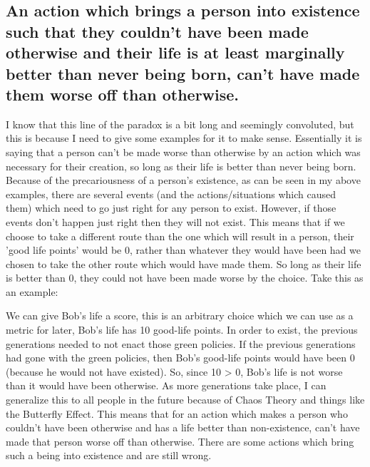\subsection{An action which brings a person into existence such that they couldn’t have been made otherwise and their life is at least marginally better than never being born, can’t have made them worse off than otherwise.}

I know that this line of the paradox is a bit long and seemingly convoluted, but this is because I need to give some examples for it to make sense. Essentially it is saying that a person can't be made worse than otherwise by an action which was necessary for their creation, so long as their life is better than never being born. Because of the precariousness of a person's existence, as can be seen in my above examples, there are several events (and the actions/situations which caused them) which need to go just right for any person to exist. However, if those events don't happen just right then they will not exist. This means that if we choose to take a different route than the one which will result in a person, their 'good life points' would be 0, rather than whatever they would have been had we chosen to take the other route which would have made them. So long as their life is better than 0, they could not have been made worse by the choice. Take this as an example:

We can give Bob's life a score, this is an arbitrary choice which we can use as a metric for later, Bob's life has 10 good-life points. In order to exist, the previous generations needed to not enact those green policies. If the previous generations had gone with the green policies, then Bob's good-life points would have been 0 (because he would not have existed). So, since 10 > 0, Bob's life is not worse than it would have been otherwise. As more generations take place, I can generalize this to all people in the future because of Chaos Theory and things like the Butterfly Effect. This means that for an action which makes a person who couldn't have been otherwise and has a life better than non-existence, can't have made that person worse off than otherwise. 
There are some actions which bring such a being into existence and are still wrong.

